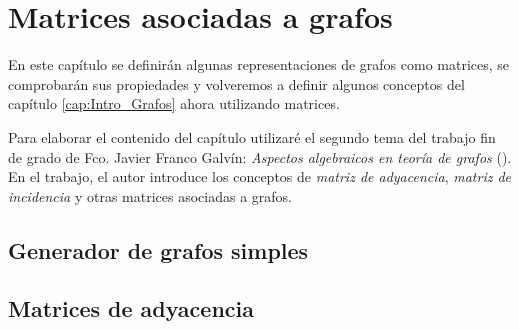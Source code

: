 \chapter{Matrices asociadas a grafos}

En este capítulo se definirán algunas representaciones de grafos como matrices,
se comprobarán sus propiedades y volveremos a definir algunos conceptos del 
capítulo \ref{cap:Intro_Grafos} ahora utilizando matrices.

Para elaborar el contenido del capítulo utilizaré el segundo tema del trabajo
fin de grado de Fco. Javier Franco Galvín: \textit{Aspectos algebraicos en
teoría de grafos} (\cite{Franco-tfg}). En el trabajo, el autor introduce los 
conceptos de \textit{matriz de adyacencia}, \textit{matriz de incidencia} y 
otras matrices asociadas a grafos.

\minitoc

\section{Generador de grafos simples}


\section{Matrices de adyacencia}



